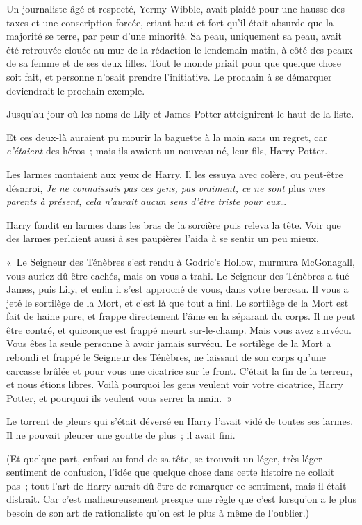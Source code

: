 Un journaliste âgé et respecté, Yermy Wibble, avait plaidé pour une hausse des taxes et une conscription forcée, criant haut et fort qu'il était absurde que la majorité se terre, par peur d'une minorité. Sa peau, uniquement sa peau, avait été retrouvée clouée au mur de la rédaction le lendemain matin, à côté des peaux de sa femme et de ses deux filles. Tout le monde priait pour que quelque chose soit fait, et personne n'osait prendre l'initiative. Le prochain à se démarquer deviendrait le prochain exemple.

Jusqu'au jour où les noms de Lily et James Potter atteignirent le haut de la liste.

Et ces deux-là auraient pu mourir la baguette à la main sans un regret, car \emph{c'étaient} des héros~; mais ils avaient un nouveau-né, leur fils, Harry Potter.

Les larmes montaient aux yeux de Harry. Il les essuya avec colère, ou peut-être désarroi, \emph{Je ne connaissais pas ces gens, pas vraiment, ce ne sont} plus \emph{mes parents à présent, cela n'aurait aucun sens d'être triste pour
eux}…

Harry fondit en larmes dans les bras de la sorcière puis releva la tête.  Voir que des larmes perlaient aussi à ses paupières l'aida à se sentir un peu mieux.

«~Le Seigneur des Ténèbres s'est rendu à Godric's Hollow, murmura McGonagall, vous auriez dû être cachés, mais on vous a trahi. Le Seigneur des Ténèbres a tué James, puis Lily, et enfin il s'est approché de vous, dans votre berceau. Il vous a jeté le sortilège de la Mort, et c'est là que tout a fini. Le sortilège de la Mort est fait de haine pure, et frappe directement l'âme en la séparant du corps. Il ne peut être contré, et quiconque est frappé meurt sur-le-champ. Mais vous avez survécu. Vous êtes la seule personne à avoir jamais survécu. Le sortilège de la Mort a rebondi et frappé le Seigneur des Ténèbres, ne laissant de son corps qu'une carcasse brûlée et pour vous une cicatrice sur le front.  C'était la fin de la terreur, et nous étions libres.  Voilà pourquoi les gens veulent voir votre cicatrice, Harry Potter, et pourquoi ils veulent vous serrer la main.~»

Le torrent de pleurs qui s'était déversé en Harry l'avait vidé de toutes ses larmes. Il ne pouvait pleurer une goutte de plus~; il avait fini.

(Et quelque part, enfoui au fond de sa tête, se trouvait un léger, très léger sentiment de confusion, l'idée que quelque chose dans cette histoire ne collait pas~; tout l'art de Harry aurait dû être de remarquer ce sentiment, mais il était distrait. Car c'est malheureusement presque une règle que c'est lorsqu'on a le plus besoin de son art de rationaliste qu'on est le plus à même de l'oublier.)

